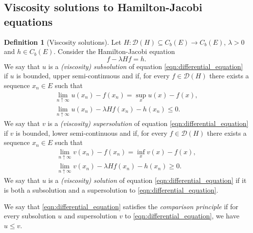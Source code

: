 \documentclass[a4paper]{article}
\newcommand{\cD}{\mathcal{D}}
\numberwithin{equation}{section}
\theoremstyle{definition}
\newtheorem{definition}[theorem]{Definition}
\newtheorem{remark}[theorem]{Remark}
\begin{document}

\subsection{Viscosity solutions to Hamilton-Jacobi equations} \label{section:preliminaries_viscosity_solutions}


\begin{definition}[Viscosity solutions]
	Let $H : \cD(H) \subseteq C_b(E) \rightarrow C_b(E)$, $\lambda > 0$ and $h \in C_b(E)$. Consider the Hamilton-Jacobi equation
	\begin{equation}
		f - \lambda H f = h. \label{eqn:differential_equation} 
	\end{equation}
	We say that $u$ is a \textit{(viscosity) subsolution} of equation \eqref{eqn:differential_equation} if $u$ is bounded, upper semi-continuous and if, for every $f \in \cD(H)$ there exists a sequence $x_n \in E$ such that
	\begin{gather*}
		\lim_{n \uparrow \infty} u(x_n) - f(x_n)  = \sup_x u(x) - f(x), \\
		\lim_{n \uparrow \infty} u(x_n) - \lambda H f(x_n) - h(x_n) \leq 0.
	\end{gather*}
	We say that $v$ is a \textit{(viscosity) supersolution} of equation \eqref{eqn:differential_equation} if $v$ is bounded, lower semi-continuous and if, for every $f \in \cD(H)$ there exists a sequence $x_n \in E$ such that
	\begin{gather*}
		\lim_{n \uparrow \infty} v(x_n) - f(x_n)  = \inf_x v(x) - f(x), \\
		\lim_{n \uparrow \infty} v(x_n) - \lambda Hf(x_n) - h(x_n) \geq 0.
	\end{gather*}
	We say that $u$ is a \textit{(viscosity) solution} of equation \eqref{eqn:differential_equation} if it is both a subsolution and a supersolution to \eqref{eqn:differential_equation}.
	
	We say that \eqref{eqn:differential_equation} satisfies the \textit{comparison principle} if for every subsolution $u$ and supersolution $v$ to \eqref{eqn:differential_equation}, we have $u \leq v$.
\end{definition}
\end{document}
